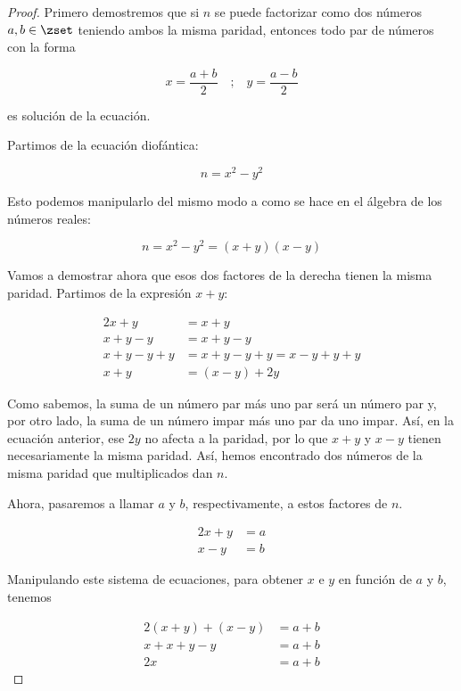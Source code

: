 \begin{proof}
  Primero demostremos que si $n$ se puede factorizar como dos números $a, b
  \in \zset$ teniendo ambos la misma paridad, entonces todo par de números
  con la forma

  $$ x = \frac{a + b}{2} \quad \text{;} \quad y = \frac{a - b}{2} $$

  \noindent es solución de la ecuación.

  Partimos de la ecuación diofántica:

  $$ n = x^2 - y^2 $$

  \noindent Esto podemos manipularlo del mismo modo a como se hace en el
  álgebra de los números reales:

  $$ n = x^2 - y^2 = (x + y)(x - y) $$

  Vamos a demostrar ahora que esos dos factores de la derecha tienen la
  misma paridad. Partimos de la expresión $x + y$:

  \begin{alignat*}{2}
    x + y           &= x + y \\
    x + y - y       &= x + y - y \\
    x + y - y + y   &= x + y - y + y = x - y + y + y \\
    x + y           &= (x - y) + 2y
  \end{alignat*}

  Como sabemos, la suma de un número par más uno par será un número par y,
  por otro lado, la suma de un número impar más uno par da uno impar. Así,
  en la ecuación anterior, ese $2y$ no afecta a la paridad, por lo que $x +
  y$ y $x - y$ tienen necesariamente la misma paridad. Así, hemos encontrado
  dos números de la misma paridad que multiplicados dan $n$.

  Ahora, pasaremos a llamar $a$ y $b$, respectivamente, a estos factores de
  $n$.

  \begin{alignat*}{2}
    x + y &= a \\
    x - y &= b
  \end{alignat*}

  Manipulando este sistema de ecuaciones, para obtener $x$ e $y$ en función
  de $a$ y $b$, tenemos

  \begin{alignat*}{2}
    (x + y) + (x - y)   &= a + b \\
    x + x + y - y       &= a + b \\
    2x                  &= a + b
  \end{alignat*}


\end{proof}
